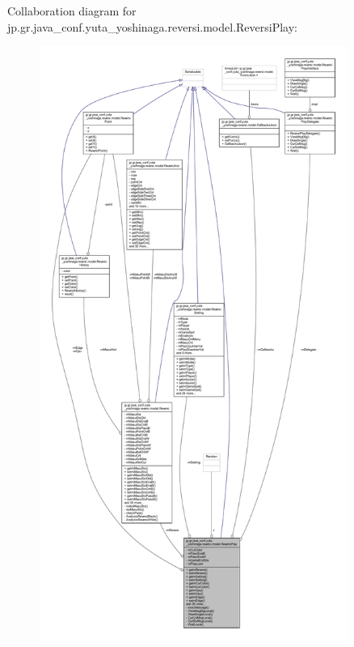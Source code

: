 Collaboration diagram for jp.\+gr.\+java\+\_\+conf.\+yuta\+\_\+yoshinaga.\+reversi.\+model.\+Reversi\+Play\+:
\nopagebreak
\begin{figure}[H]
\begin{center}
\leavevmode
\includegraphics[height=550pt]{classjp_1_1gr_1_1java__conf_1_1yuta__yoshinaga_1_1reversi_1_1model_1_1_reversi_play__coll__graph}
\end{center}
\end{figure}
